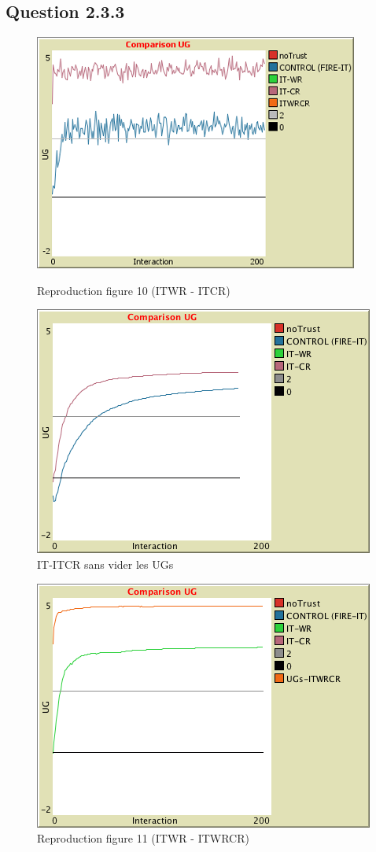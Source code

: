 \subsection{Question 2.3.3}
\begin{figure}[H]
   \begin{minipage}{0.48\textwidth}
     \centering
     \includegraphics[width=.7\linewidth]{images/ITvsITCR.png}
     \caption{Reproduction figure 10 (ITWR - ITCR)}\label{Fig:Data1}
   \end{minipage}\hfill
   \begin{minipage}{0.48\textwidth}
     \centering
     \includegraphics[width=.7\linewidth]{images/ITvsITCR2.png}
     \caption{IT-ITCR sans vider les UGs}\label{Fig:Data2}
   \end{minipage}
\end{figure}

\begin{figure}[H]
\centering
\captionsetup{justification=centering}
\includegraphics[width=0.4\linewidth]{images/ITWRvsITWRCR.png}
\caption{Reproduction figure 11 (ITWR - ITWRCR)}
\label{fig:fig11}
\end{figure}

